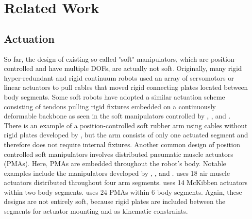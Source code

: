 \section{Related Work}
\label{sec:Related Work}

\subsection{Actuation}
\label{subsec:Related Work, Actuation}
So far, the design of existing so-called "soft" manipulators, which are position-controlled and have multiple DOFs, are actually not soft.
Originally, many rigid hyper-redundant and rigid continuum robots \citep{hannan2003kinematics} \citep{cieslak1999elephant} \citep{buckingham2002snake} used an array of servomotors or linear actuators to pull cables that moved rigid connecting plates located between body segments.
Some soft robots have adopted a similar actuation scheme consisting of tendons pulling rigid fixtures embedded on a continuously deformable backbone as seen in the soft manipulators controlled by \citet{gravagne2002uniform}, \citet{mcmahan2005design}, and \citet{camarillo2009configuration}.
There is an example of a position-controlled soft rubber arm using cables without rigid plates developed by \citet{wang2013visual}, but the arm consists of only one actuated segment and therefore does not require internal fixtures.
Another common design of position controlled soft manipulators involves distributed pneumatic muscle actuators (PMAs).
Here, PMAs are embedded throughout the robot's body.
Notable examples include the manipulators developed by \citet{mcmahan2006field}, \citet{pritts2004design}, and \citet{kang2013design}.
\citet{mcmahan2006field} uses 18 air muscle actuators distributed throughout four arm segments.
\citet{pritts2004design} uses 14 McKibben actuators within two body segments.
\citet{kang2013design} uses 24 PMAs within 6 body segments.
Again, these designs are not entirely soft, because rigid plates are included between the segments for actuator mounting and as kinematic constraints.

